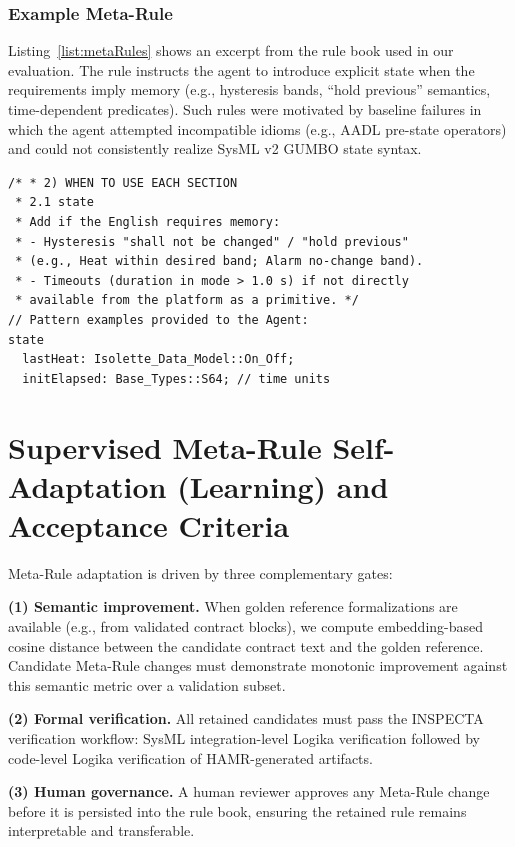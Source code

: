 \documentclass[conference]{IEEEtran}
\begin{document}
\subsubsection{Example Meta-Rule}
Listing~\ref{list:metaRules} shows an excerpt from the rule book used in our evaluation. The rule instructs the agent to introduce explicit state when the requirements imply memory (e.g., hysteresis bands, ``hold previous'' semantics, time-dependent predicates). Such rules were motivated by baseline failures in which the agent attempted incompatible idioms (e.g., AADL pre-state operators) and could not consistently realize SysML v2 GUMBO state syntax.

\begin{lstlisting}[caption={Extract from Gumbo FSE Agent Plan: Meta-Rules for State Formalization.}, label={list:metaRules}]
/* * 2) WHEN TO USE EACH SECTION
 * 2.1 state
 * Add if the English requires memory:
 * - Hysteresis "shall not be changed" / "hold previous" 
 * (e.g., Heat within desired band; Alarm no-change band).
 * - Timeouts (duration in mode > 1.0 s) if not directly 
 * available from the platform as a primitive. */
// Pattern examples provided to the Agent:
state
  lastHeat: Isolette_Data_Model::On_Off;
  initElapsed: Base_Types::S64; // time units
\end{lstlisting}

\section{Supervised Meta-Rule Self-Adaptation (Learning) and Acceptance Criteria}
\label{sec:meta-learning}
Meta-Rule adaptation is driven by three complementary gates:

\textbf{(1) Semantic improvement.} When golden reference formalizations are available (e.g., from validated contract blocks), we compute embedding-based cosine distance between the candidate contract text and the golden reference. Candidate Meta-Rule changes must demonstrate monotonic improvement against this semantic metric over a validation subset.

\textbf{(2) Formal verification.} All retained candidates must pass the INSPECTA verification workflow: SysML integration-level Logika verification followed by code-level Logika verification of HAMR-generated artifacts.

\textbf{(3) Human governance.} A human reviewer approves any Meta-Rule change before it is persisted into the rule book, ensuring the retained rule remains interpretable and transferable.
\end{document}

